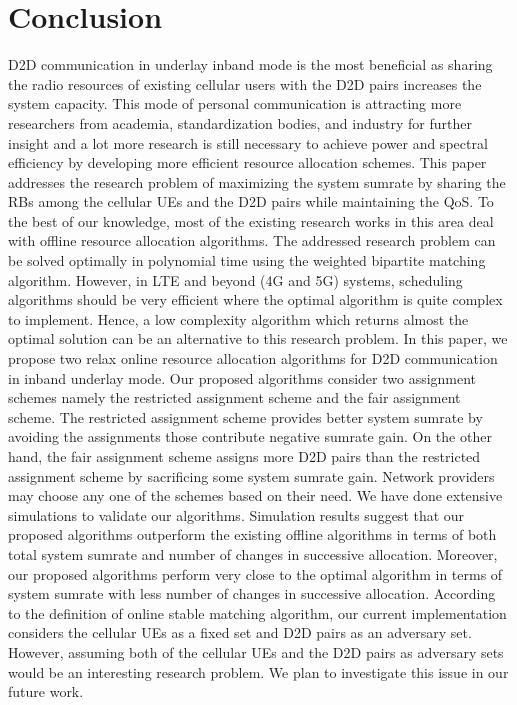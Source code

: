 \documentclass[times]{dacauth}
\begin{document}
\section{Conclusion}\label{section:Conclusion}
\vspace {-0.3cm}
\smallskip
\noindent
D2D communication in underlay inband mode is the most beneficial as sharing the radio resources of existing cellular users with the D2D pairs increases the system capacity. This mode of personal communication is attracting more researchers from academia, standardization bodies, and industry for further insight and a lot more research is still necessary to achieve power and spectral efficiency by developing more efficient resource allocation schemes. This paper addresses the research problem of maximizing the system sumrate by sharing the RBs among the cellular UEs and the D2D pairs while maintaining the QoS. To the best of our knowledge, most of the existing research works in this area deal with offline resource allocation algorithms. The addressed research problem can be solved optimally in polynomial time using the weighted bipartite matching algorithm. However, in LTE and beyond (4G and 5G) systems, scheduling algorithms should be very efficient where the optimal algorithm is quite complex to implement. Hence, a low complexity algorithm which returns almost the optimal solution can be an alternative to this research problem. In this paper, we propose two relax online resource allocation algorithms for D2D communication in inband underlay mode. Our proposed algorithms consider two assignment schemes namely the restricted assignment scheme and the fair assignment scheme. The restricted assignment scheme provides better system sumrate by avoiding the assignments those contribute negative sumrate gain. On the other hand, the fair assignment scheme assigns more D2D pairs than the restricted assignment scheme by sacrificing some system sumrate gain. Network providers may choose any one of the schemes based on their need. We have done extensive simulations to validate our algorithms. Simulation results suggest that our proposed algorithms outperform the existing offline algorithms in terms of both total system sumrate and number of changes in successive allocation. Moreover, our proposed algorithms perform very close to the optimal algorithm in terms of system sumrate with less number of changes in successive allocation. According to the definition of online stable matching algorithm, our current implementation considers the cellular UEs as a fixed set and D2D pairs as an adversary set. However, assuming both of the cellular UEs and the D2D pairs as adversary sets would be an interesting research problem. We plan to investigate this issue in our future work.



\end{document}
